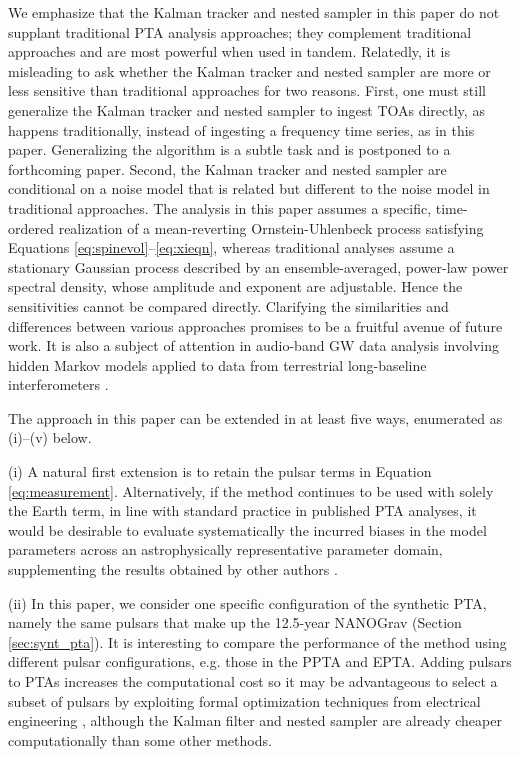 \documentclass[fleqn,usenatbib,useAMS]{mnras}
\begin{document}
 
We emphasize that the Kalman tracker and nested sampler in this paper do not supplant traditional PTA analysis approaches; they complement traditional approaches and are most powerful when used in tandem. Relatedly, it is misleading to ask whether the Kalman tracker and nested sampler are more or less sensitive than traditional approaches for two reasons. First, one must still generalize the Kalman tracker and nested sampler to ingest TOAs directly, as happens traditionally, instead of ingesting a frequency time series, as in this paper. Generalizing the algorithm is a subtle task and is postponed to a forthcoming paper. Second, the Kalman tracker and nested sampler are conditional on a noise model that is related but different to the noise model in traditional approaches. The analysis in this paper assumes a specific, time-ordered realization of a mean-reverting Ornstein-Uhlenbeck process satisfying Equations \eqref{eq:spinevol}--\eqref{eq:xieqn}, whereas traditional analyses assume a stationary Gaussian process described by an ensemble-averaged, power-law power spectral density, whose amplitude and exponent are adjustable. Hence the sensitivities cannot be compared directly. Clarifying the similarities and differences between various approaches promises to be a fruitful avenue of future work. It is also a subject of attention in audio-band GW data analysis involving hidden Markov models applied to data from terrestrial long-baseline interferometers \citep{PhysRevD.102.023006,PhysRevD.105.022002,Abbott_2022SCO,2022PhRvD.106f2002A}. \newline 



 The approach in this paper can be extended in at least five ways, enumerated as (i)--(v) below. \newline 
 
(i) A natural first extension is to retain the pulsar terms in Equation \eqref{eq:measurement}. Alternatively, if the method continues to be used with solely the Earth term, in line with standard practice in published PTA analyses, it would be desirable to evaluate systematically the incurred biases in the model parameters across an astrophysically representative parameter domain, supplementing the results obtained by other authors \citep{Zhupulsarterms,Chen2022}.\newline 


(ii) In this paper, we consider one specific configuration of the synthetic PTA, namely the same pulsars that make up the 12.5-year NANOGrav (Section \ref{sec:synt_pta}). It is interesting to compare the performance of the method using different pulsar configurations, e.g. those in the PPTA and EPTA. Adding pulsars to PTAs increases the computational cost so it may be advantageous to select a subset of pulsars by exploiting formal optimization techniques from electrical engineering \citep{2023MNRAS.518.1802S}, although the Kalman filter and nested sampler are already cheaper computationally than some other methods. \newline 
\end{document}
